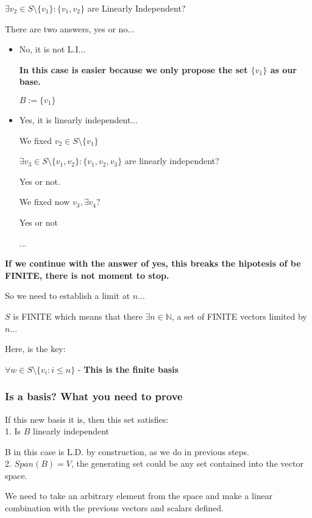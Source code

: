 \documentclass{article}
\begin{document}
\(\exists v_2 \in S\text{\textbackslash}\{v_1\} : \{v_1, v_2\}\) are Linearly Independent?

There are two answers, yes or no...
\begin{itemize}

    \item No, it is not L.I...

    \textbf{In this case is easier because we only propose the set \(\{v_1\}\) as our base.}

    \(B := \{v_1\}\)
    
    \item Yes, it is linearly independent...

    We fixed \(v_2\in S\text{\textbackslash} \{v_1\}\)

    \(\exists v_3 \in S\text{\textbackslash} \{v_1, v_2\} : \{v_1, v_2, v_3\}\) are linearly independent?

    Yes or not.
    
    We fixed now \(v_3, \exists v_4?\)
    
    Yes or not

    ...
\end{itemize}

\textbf{If we continue with the answer of yes, this breaks the hipotesis of be FINITE, there is not moment to stop.}

So we need to establish a limit at \(n\)...

\(S\) is FINITE which means that there \(\exists n \in \mathbb{N}\), a set of FINITE vectors limited by \(n\)...

Here, is the key:

\(\forall w\in S\text{\textbackslash} \{v_i : i \leq n\}\) - \textbf{This is the finite basis}

\subsubsection*{Is a basis? What you need to prove}
If this new basis it is, then this set satisfies:
\\

1. Is \(B\) linearly independent

B in this case is L.D. by construction, as we do in previous steps.
\\

2. \(Span(B) = V\), the generating set could be any set contained into the vector space.

We need to take an arbitrary element from the space and make a linear combination with the previous vectors and scalars defined.
\end{document}
